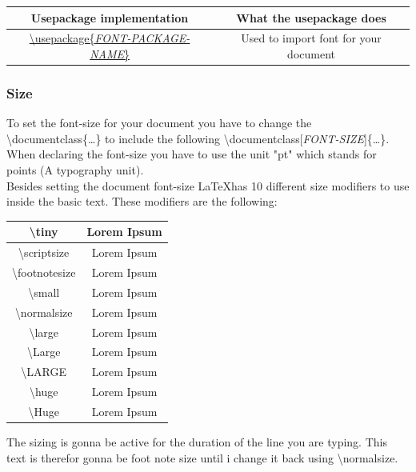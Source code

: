 \documentclass{article}
\newcommand{\bs}[1]{\textbackslash{}#1} %
\begin{document}
\vspace{1.5em}
\begin{table}[H]
    \noindent
    \centering
    \begin{tabular}{|c|c|} \hline
        \rowcolor{gray!30}
        Usepackage implementation & What the usepackage does \\ \hline
        \hyperref[subsubsec:text_family]{\bs{usepackage\{\textit{FONT-PACKAGE-NAME}\}}} & Used to import font for your document \\ \hline
    \end{tabular}
\end{table} %


\subsubsection{Size}\label{subsubsec:text_size}
To set the font-size for your document you have to change the \bs{documentclass\{\ldots\}} to include the following \bs{documentclass[\textit{FONT-SIZE}]\{\ldots\}}. When declaring the font-size you have to use the unit "pt" which stands for points (A typography unit).\\


Besides setting the document font-size \LaTeX has 10 different size modifiers to use inside the basic text. These modifiers are the following: \\

\begin{table}[H]
    \centering
    \begin{tabular}{|c|c|}
    \hline
        \bs{tiny} & \tiny{Lorem Ipsum}  \\ \hline 
        \bs{scriptsize} & \scriptsize{Lorem Ipsum} \\ \hline
        \bs{footnotesize} & \footnotesize Lorem Ipsum \\ \hline
        \bs{small} & \small Lorem Ipsum\\ \hline
        \bs{normalsize} & \normalsize Lorem Ipsum\\ \hline
        \bs{large} & \large Lorem Ipsum \\ \hline
        \bs{Large} & \Large Lorem Ipsum \\ \hline
        \bs{LARGE} & \LARGE Lorem Ipsum \\ \hline
        \bs{huge} & \huge Lorem Ipsum \\ \hline
        \bs{Huge} & \Huge Lorem Ipsum  \\ \hline
    \end{tabular}
    \label{tab:font_size}
\end{table}
The sizing is gonna be active for the duration of the line you are typing. \footnotesize This text is therefor gonna be foot note size until i change it back using \bs{normalsize}. \normalsize
\end{document}
